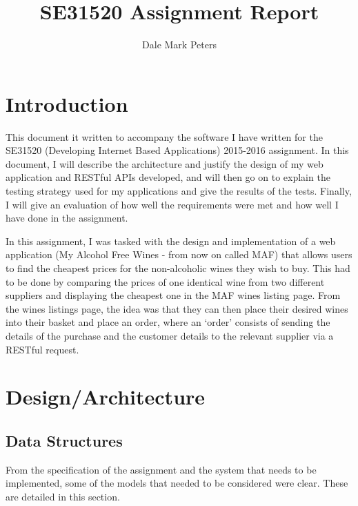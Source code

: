 \documentclass[a4paper,12pt,hidelinks]{report}
\title{SE31520 Assignment Report}
\author{Dale Mark Peters}
\begin{document}
\maketitle

\renewcommand{\abstractname}{Acknowledgements}
\begin{abstract}
\end{abstract}
\restoregeometry

\tableofcontents\newpage
\chapter{Introduction}
    This document it written to accompany the software I have written for the SE31520 (Developing Internet Based Applications) 2015-2016 assignment. In this
    document, I will describe the architecture and justify the design of my web application and RESTful APIs developed, and will then go on
    to explain the testing strategy used for my applications and give the results of the tests. Finally, I will give an evaluation of how well the requirements
    were met and how well I have done in the assignment.

    In this assignment, I was tasked with the design and implementation of a web application (My Alcohol Free Wines - from now on called MAF) that allows users to find the cheapest prices
    for the non-alcoholic wines they wish to buy. This had to be done by comparing the prices of one identical wine from two different suppliers and displaying the
    cheapest one in the MAF wines listing page. From the wines listings page, the idea was that they can then place their desired wines into their basket and place
    an order, where an `order' consists of sending the details of the purchase and the customer details to the relevant supplier via a RESTful request.

\chapter{Design/Architecture}
    \section{Data Structures}
    From the specification of the assignment and the system that needs to be implemented, some of the models that needed to be considered were clear. 
    These are detailed in this section.
    
\end{document}
